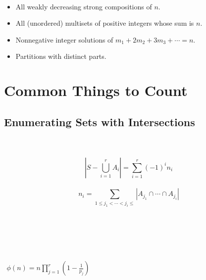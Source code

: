 \documentclass[12pt]{article}
\begin{document}
	
	\begin{tcolorbox}
	\\
	\begin{itemize}
	\item All weakly decreasing strong compositions of $n$.
	\item All (unordered) multisets of positive integers whose sum is $n$.
	\item Nonnegative integer solutions of $m_1+2m_2+3m_3+\cdots = n$.
	\end{itemize}
	\begin{itemize}
	\item Partitions with distinct parts.
	\end{itemize}
	\end{tcolorbox}
	
	
	
\newpage
\section{Common Things to Count}
\begin{center} \end{center}
\vspace{-1em}
	

	\subsection{Enumerating Sets with Intersections}
	\begin{center} \end{center}
	
	\begin{tcolorbox}
	\\
	\\
	\text{Then,}
	$$\left|S - \bigcup_{i=1}^r A_i \right| =  \sum_{i=1}^r (-1)^i n_i $$
	 \\
	$$n_i = \sum_{1\le j_1<\cdots<j_i\le} \left| A_{j_1}\cap \cdots \cap A_{j_i}\right|$$
	\hfill {}\\
	\end{tcolorbox}
	
	
	\begin{tcolorbox}
	\\
	\\
	\\
	
	\hfill
	\begin{center}
	$\begin{aligned}
	\phi(n) = n\prod_{j=1}^r\left(1-\frac{1}{p_j}\right)
	\end{aligned}$
	\end{center}
	\end{tcolorbox}
	
\end{document}
